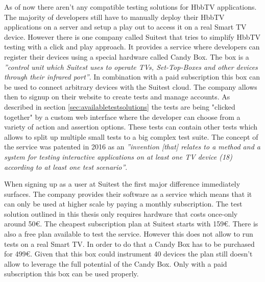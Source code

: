 As of now there aren't any compatible testing solutions for HbbTV applications. The majority of developers still have to manually deploy their HbbTV applications on a server and setup a play out to access it on a real Smart TV device. However there is one company called Suitest that tries to simplify HbbTV testing with a click and play approach. It provides a service where developers can register their devices using a special hardware called Candy Box. The box is a \textit{''control unit which Suitest uses to operate TVs, Set-Top-Boxes and other devices through their infrared port''}\cite{candybox}. In combination with a paid subscription this box can be used to connect arbitrary devices with the Suitest cloud. The company allows then to signup on their website to create tests and manage accounts. As described in section \ref{sec:availabletestsolutions} the tests are being "clicked together" by a custom web interface where the developer can choose from a variety of action and assertion options. These tests can contain other tests which allows to split up multiple small tests to a big complex test suite. The concept of the service was patented in 2016 as an \textit{''invention [that] relates to a method and a system for testing interactive applications on at least one TV device (18) according to at least one test scenario''}\cite{krocek2016method}.

When signing up as a user at Suitest the first major difference immediately surfaces. The company provides their software as a service which means that it can only be used at higher scale by paying a monthly subscription. The test solution outlined in this thesis only requires hardware that costs once-only around 50\euro. The cheapest subscription plan at Suitest starts with 159\euro. There is also a free plan available to test the service. However this does not allow to run tests on a real Smart TV. In order to do that a Candy Box has to be purchased for 499\euro. Given that this box could instrument 40 devices the plan still doesn't allow to leverage the full potential of the Candy Box. Only with a paid subscription this box can be used properly.

